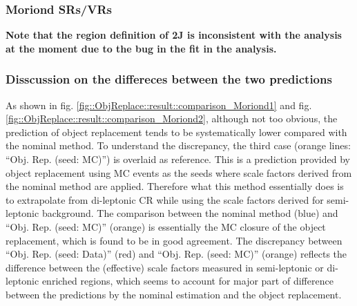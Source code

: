 \subsubsection{Moriond SRs/VRs} \label{sec::ObjReplace::result::Moriond}
\textbf{Note that the region definition of 2J is inconsistent with the analysis at the moment due to the bug in the fit in the analysis.}



\clearpage

\subsubsection{Disscussion on the differeces between the two predictions}
As shown in fig. \ref{fig::ObjReplace::result::comparison_Moriond1} and fig. \ref{fig::ObjReplace::result::comparison_Moriond2}, although not too obvious, the prediction of object replacement tends to be systematically lower compared with the nominal method. To understand the discrepancy, the third case (orange lines: ``Obj. Rep. (seed: MC)'') is overlaid as reference. This is a prediction provided by object replacement using MC events as the seeds where scale factors derived from the nominal method are applied. Therefore what this method essentially does is to extrapolate from di-leptonic CR while using the scale factors derived for semi-leptonic background. The comparison between the nominal method (blue) and ``Obj. Rep. (seed: MC)'' (orange) is essentially the MC closure of the object replacement, which is found to be in good agreement. The discrepancy between ``Obj. Rep. (seed: Data)'' (red) and ``Obj. Rep. (seed: MC)'' (orange) reflects the difference between the (effective) scale factors measured in semi-leptonic or di-leptonic enriched regions, which seems to account for major part of difference between the predictions by the nominal estimation and the object replacement.

